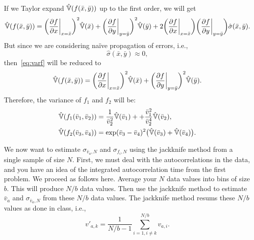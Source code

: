 \Answer{}
If we Taylor expand \(\hat{\mathbb{V}}(f(\bar{x}, \bar{y}))\) up to the first order, we will
get
%
\begin{equation}\label{eq:varf}
    \hat{\mathbb{V}}(f(\bar{x}, \bar{y})) =
    \biggl(\frac{ \partial f }{ \partial x } \biggr|_{x = \bar{x}}\biggr)^2 \hat{\mathbb{V}}(\bar{x}) +
    \biggl(\frac{ \partial f }{ \partial y } \biggr|_{y = \bar{y}}\biggr)^2 \hat{\mathbb{V}}(\bar{y}) +
    2\biggl(\frac{ \partial f }{ \partial x } \biggr|_{x = \bar{x}}\biggr)
    \biggl(\frac{ \partial f }{ \partial y } \biggr|_{y = \bar{y}}\biggr)
    \hat{\sigma}(\bar{x}, \bar{y}).
\end{equation}
%
But since we are considering naïve propagation of errors, i.e.,
%
\begin{equation}
    \hat{\sigma}(\bar{x}, \bar{y}) \approx 0,
\end{equation}
%
then~\eqref{eq:varf} will be reduced to
%
\begin{equation}
    \hat{\mathbb{V}}(f(\bar{x}, \bar{y})) =
    \biggl(\frac{ \partial f }{ \partial x } \biggr|_{x = \bar{x}}\biggr)^2 \hat{\mathbb{V}}(\bar{x}) +
    \biggl(\frac{ \partial f }{ \partial y } \biggr|_{y = \bar{y}}\biggr)^2 \hat{\mathbb{V}}(\bar{y}).
\end{equation}
%
Therefore, the variance of \(f_1\) and \(f_2\) will be:
%
\begin{align}
    \hat{\mathbb{V}}(f_1(\bar{v}_1, \bar{v}_2)) & =
    \frac{ 1 }{ \bar{v}^2_2 } \hat{\mathbb{V}}(\bar{v}_1) +
    +\frac{ \bar{v}^2_1 }{ \bar{v}^4_2 } \hat{\mathbb{V}}(\bar{v}_2), \\
    \hat{\mathbb{V}}(f_2(\bar{v}_3, \bar{v}_4)) & =
    \exp( \bar{v}_3 - \bar{v}_4 )^2 \bigl(\hat{\mathbb{V}}(\bar{v}_3) + \hat{\mathbb{V}}(\bar{v}_4)\bigr).
\end{align}


\Question{} We now want to estimate \(\sigma_{\bar{v}_a,N}\) and \(\sigma_{f_i,N}\) using
the jackknife method from a single sample of size \(N\).
First, we must deal with the autocorrelations in the data, and you have an idea of the
integrated autocorrelation time from the first problem. We proceed as follows here. Average
your \(N\) data values into bins of size \(b\). This will produce \(N/b\) data values.
Then use the jackknife method to estimate \(\bar{v}_a\) and \(\sigma_{\bar{v}_a,N}\) from
these \(N/b\) data values. The jackknife method resums these \(N/b\) values as done in class,
i.e.,
%
\begin{equation}
    v'_{a,k} = \frac{ 1 }{ N / b - 1 } \sum_{i=1, i \neq k}^{N/b} v_{a,i}.
\end{equation}

